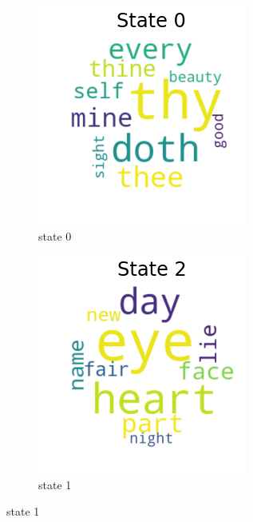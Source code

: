 \begin{figure}[H]
	\centering
	\begin{subfigure}[t]{0.3\textwidth}
		\includegraphics[width=\textwidth]{s1.png}
		\caption{state 0}
	\end{subfigure}%
	\begin{subfigure}[t]{0.3\textwidth}
		\includegraphics[width=\textwidth]{s3.png}
		\caption{state 1}
	\end{subfigure}%
	

\end{figure}
